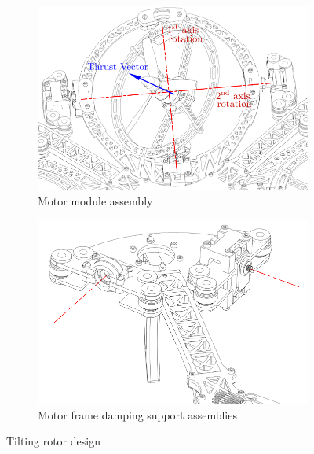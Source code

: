 \begin{figure}[hbtp]
\begin{subfigure}{.49\textwidth}
\centering
\includegraphics[width=\textwidth]{figs/motor-assembly}
\caption{Motor module assembly}
\label{fig:motor-assembly}
\end{subfigure}
\begin{subfigure}{.49\textwidth}
\centering
\includegraphics[width=\textwidth]{figs/motor-support}
\caption{Motor frame damping support assemblies}
\label{fig:motor_support}
\end{subfigure}
\caption{Tilting rotor design}
\end{figure}
